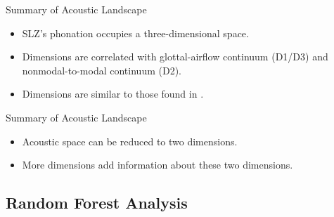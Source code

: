 \documentclass[professionalfonts]{beamer}
\begin{document}
\begin{frame}{Summary of Acoustic Landscape}
  \begin{itemize}
    \item SLZ's phonation occupies a three-dimensional space.
    \item Dimensions are correlated with glottal-airflow continuum (D1/D3) and nonmodal-to-modal continuum (D2).
    \item Dimensions are similar to those found in \citet{keatingCrosslanguageAcousticSpace2023}.
  \end{itemize}
\end{frame}

\begin{frame}{Summary of Acoustic Landscape}
  \begin{itemize}
    \item Acoustic space can be reduced to two dimensions.
    \item More dimensions add information about these two dimensions.
  \end{itemize}
  \begin{figure}
    \centering
  \end{figure}
\end{frame}

\subsection{Random Forest Analysis}
\end{document}
